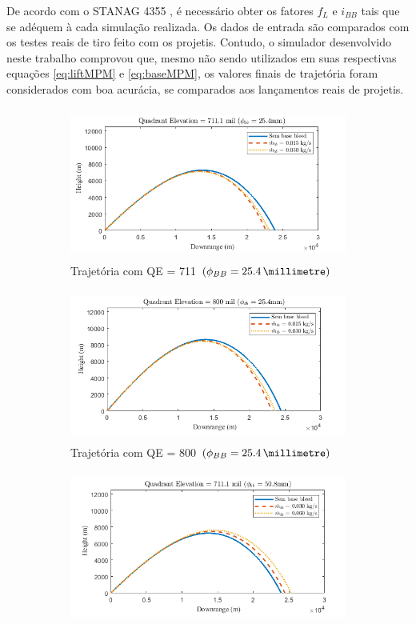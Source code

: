 De acordo com o STANAG 4355 \cite{stanag4355}, é necessário obter os fatores $f_{L}$ e $i_{BB}$ tais que se adéquem à cada simulação realizada. Os dados de entrada são comparados com os testes reais de tiro feito com os projetis. Contudo, o simulador desenvolvido neste trabalho comprovou que, mesmo não sendo utilizados em suas respectivas equações \ref{eq:liftMPM} e \ref{eq:baseMPM}, os valores finais de trajetória foram considerados com boa acurácia, se comparados aos lançamentos reais de projetis.

\begin{figure}[!ht]
	\centering
	\begin{subfigure}[b]{0.47\textwidth}
        \centering
        \includegraphics[height=5cm,width=\textwidth]{trajetoria_thallyo_wallace_basebleed-foto1.png}
        \caption{Trajetória com QE = \qty{711}{\milliradian} $\left(\phi_{BB} = \qty{25,4}{\millimetre}\right)$}
        \label{fig:trajetoria-711mil-1pol}
    \end{subfigure}
    \hfill
    \begin{subfigure}[b]{0.47\textwidth}
        \centering
        \includegraphics[height=5cm,width=\textwidth]{trajetoria_thallyo_wallace_basebleed-foto2.png}
        \caption{Trajetória com QE = \qty{800}{\milliradian} $\left(\phi_{BB} = \qty{25,4}{\millimetre}\right)$}
        \label{fig:trajetoria-800mil-1pol}
    \end{subfigure}
    \hfill
    \begin{subfigure}[b]{0.47\textwidth}
        \centering
        \includegraphics[height=5cm,width=\textwidth]{trajetoria_thallyo_wallace_basebleed-foto3.png}

\end{subfigure}
\end{figure}

